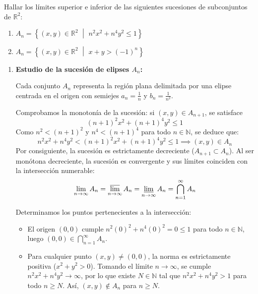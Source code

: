 \newpage
\begin{problema}
Hallar los límites superior e inferior de las siguientes sucesiones de subconjuntos de $\mathbb{R}^2$:
\begin{enumerate}[label=\alph*)]
    \item $A_n = \left\{ (x,y) \in \mathbb{R}^2 \,\,\middle|\,\, n^2 x^2 + n^4 y^2 \le 1 \right\}$
    \item $A_n = \left\{ (x,y) \in \mathbb{R}^2 \,\,\middle|\,\, x + y > (-1)^n \right\}$
\end{enumerate}

\tcblower

\begin{enumerate}[label=\alph*)]
    \item \textbf{Estudio de la sucesión de elipses $A_n$:}
    
    Cada conjunto $A_n$ representa la región plana delimitada por una elipse centrada en el origen con semiejes $a_n = \frac{1}{n}$ y $b_n = \frac{1}{n^2}$.
    
    Comprobamos la monotonía de la sucesión: si $(x,y) \in A_{n+1}$, se satisface
    \[
        (n+1)^2 x^2 + (n+1)^4 y^2 \le 1
    \]
    Como $n^2 < (n+1)^2$ y $n^4 < (n+1)^4$ para todo $n \in \mathbb{N}$, se deduce que:
    \[
        n^2 x^2 + n^4 y^2 < (n+1)^2 x^2 + (n+1)^4 y^2 \le 1 \implies (x,y) \in A_n
    \]
    Por consiguiente, la sucesión es estrictamente decreciente ($A_{n+1} \subset A_n$). Al ser monótona decreciente, la sucesión es convergente y sus límites coinciden con la intersección numerable:
    \[
        \lim_{n \to \infty} A_n = \varlimsup_{n \to \infty} A_n = \varliminf_{n \to \infty} A_n = \bigcap_{n=1}^\infty A_n
    \]
    
    Determinamos los puntos pertenecientes a la intersección:
    \begin{itemize}
        \item El origen $(0,0)$ cumple $n^2(0)^2 + n^4(0)^2 = 0 \le 1$ para todo $n \in \mathbb{N}$, luego $(0,0) \in \bigcap_{n=1}^\infty A_n$.
        \item Para cualquier punto $(x,y) \neq (0,0)$, la norma es estrictamente positiva ($x^2 + y^2 > 0$). Tomando el límite $n \to \infty$, se cumple $n^2 x^2 + n^4 y^2 \to \infty$, por lo que existe $N \in \mathbb{N}$ tal que $n^2 x^2 + n^4 y^2 > 1$ para todo $n \ge N$. Así, $(x,y) \notin A_n$ para $n \ge N$.
    \end{itemize}
    

\end{enumerate}
\end{problema}

